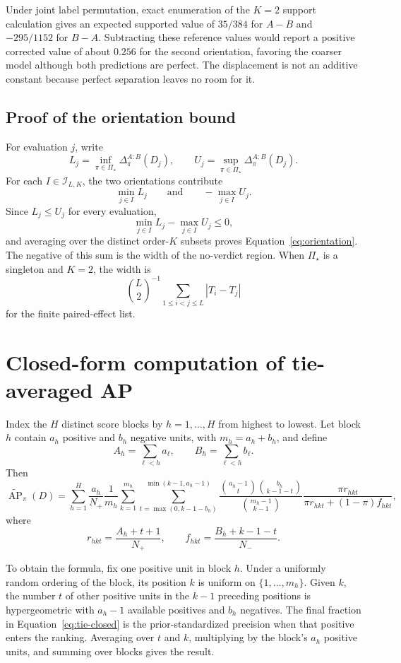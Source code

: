 \documentclass[11pt]{article}
\newcommand{\AP}{\operatorname{AP}}
\newcommand{\PSet}{\Pi_\star}
\newcommand{\APta}{\widetilde{\AP}}
\theoremstyle{remark}
\begin{document}
Under joint label permutation, exact enumeration of the $K=2$ support calculation gives an expected supported value of $35/384$ for $A-B$ and $-295/1152$ for $B-A$. Subtracting these reference values would report a positive corrected value of about $0.256$ for the second orientation, favoring the coarser model although both predictions are perfect. The displacement is not an additive constant because perfect separation leaves no room for it.

\subsection{Proof of the orientation bound}

For evaluation $j$, write
\[
L_j=\inf_{\pi\in\PSet}\Delta^{A:B}_\pi(D_j),
\qquad
U_j=\sup_{\pi\in\PSet}\Delta^{A:B}_\pi(D_j).
\]
For each $I\in\mathcal I_{L,K}$, the two orientations contribute
\[
\min_{j\in I}L_j
\qquad\text{and}\qquad
-\max_{j\in I}U_j.
\]
Since $L_j\leq U_j$ for every evaluation,
\[
\min_{j\in I}L_j-\max_{j\in I}U_j
\leq0,
\]
and averaging over the distinct order-$K$ subsets proves
Equation~\eqref{eq:orientation}. The negative of this sum is the width of the
no-verdict region. When $\PSet$ is a singleton and $K=2$, the width is
\[
\binom{L}{2}^{-1}\sum_{1\leq i<j\leq L}|T_i-T_j|
\]
for the finite paired-effect list.

\section{Closed-form computation of tie-averaged AP}
\label{app:tie-computation}

Index the $H$ distinct score blocks by $h=1,\ldots,H$ from highest to lowest. Let block $h$ contain $a_h$ positive and $b_h$ negative units, with $m_h=a_h+b_h$, and define
\[
A_h=\sum_{\ell<h}a_\ell,
\qquad
B_h=\sum_{\ell<h}b_\ell.
\]
Then
\begin{equation}
\APta_\pi(D)
=
\sum_{h=1}^{H}
\frac{a_h}{N_+}\frac1{m_h}
\sum_{k=1}^{m_h}
\sum_{t=\max(0,k-1-b_h)}^{\min(k-1,a_h-1)}
\frac{\binom{a_h-1}{t}\binom{b_h}{k-1-t}}
{\binom{m_h-1}{k-1}}
\frac{\pi r_{hkt}}
{\pi r_{hkt}+(1-\pi)f_{hkt}},
\label{eq:tie-closed}
\end{equation}
where
\[
r_{hkt}=\frac{A_h+t+1}{N_+},
\qquad
f_{hkt}=\frac{B_h+k-1-t}{N_-}.
\]

To obtain the formula, fix one positive unit in block $h$. Under a uniformly random ordering of the block, its position $k$ is uniform on $\{1,\ldots,m_h\}$. Given $k$, the number $t$ of other positive units in the $k-1$ preceding positions is hypergeometric with $a_h-1$ available positives and $b_h$ negatives. The final fraction in Equation~\eqref{eq:tie-closed} is the prior-standardized precision when that positive enters the ranking. Averaging over $t$ and $k$, multiplying by the block's $a_h$ positive units, and summing over blocks gives the result.
\end{document}
